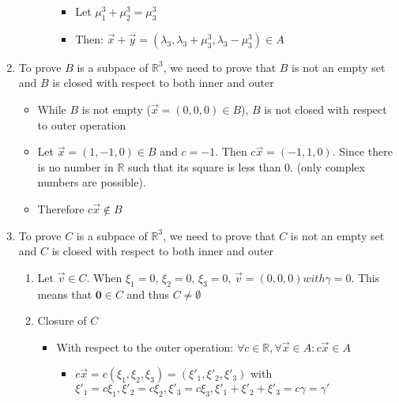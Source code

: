 \documentclass[12pt]{article}
\begin{document}
\begin{enumerate}[label=(\alph*)]
\begin{enumerate}[label=\arabic*.]
\begin{itemize}
\begin{itemize}
                                        \item Let $\mu_1^3 + \mu_2^3 = \mu_3^3$
                                        \item Then: $\vec{x} + \vec{y} = (\lambda_3, \lambda_3 + \mu_3^3, \lambda_3 - \mu_3^3) \in A$
                                    \end{itemize}
                            \end{itemize} 
                    \end{enumerate}
                \item To prove $B$ is a subpace of $\mathbb{R}^3$, we need to prove that $B$ is not an empty set and $B$ is closed with respect to both inner and outer
                    \begin{itemize}
                        \item While $B$ is not empty ($\vec{x} = (0, 0, 0) \in B$), $B$ is not closed with respect to outer operation
                        \item Let $\vec{x} = (1, -1, 0) \in B$ and $c = -1$. Then $c\vec{x} = (-1, 1, 0)$. Since there is no number in $\mathbb{R}$ such that its square is less than 0. (only complex numbers are possible). 
                        \item Therefore $c\vec{x} \notin B$
                    \end{itemize}
                \item To prove $C$ is a subpace of $\mathbb{R}^3$, we need to prove that $C$ is not an empty set and $C$ is closed with respect to both inner and outer
                    \begin{enumerate}[label=\arabic*.]
                        \item Let $\vec{v}\in C$. When $\xi_1 = 0$, $\xi_2 = 0$, $\xi_3 = 0$, $\vec{v} = (0, 0, 0) with \gamma = 0$. This means that $\textbf{0}\in C$ and thus $C \neq \emptyset$
                        \item Closure of $C$
                            \begin{itemize}
                                \item With respect to the outer operation: 
                                    $\forall c\in \mathbb{R}, \forall\vec{x}\in A: c\vec{x}\in A$
                                    \begin{itemize}
                                        \item $c\vec{x} = c(\xi_1, \xi_2, \xi_3) = (\xi'_1, \xi'_2, \xi'_3)$ with $\xi'_1 = c\xi_1, \xi'_2 = c\xi_2, \xi'_3 = c\xi_3, \xi'_1 + \xi'_2 + \xi'_3 = c\gamma = \gamma'$

\end{itemize}
\end{itemize}
\end{enumerate}
\end{enumerate}
\end{document}
